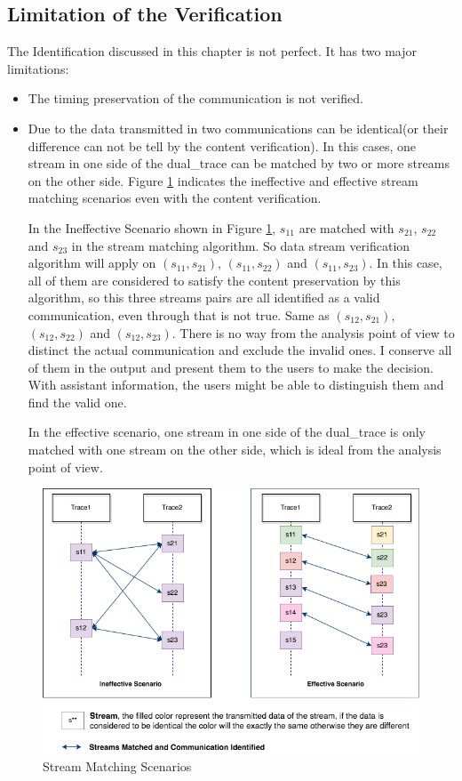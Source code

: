 \subsection{Limitation of the Verification}
The Identification discussed in this chapter is not perfect. It has two major limitations:
\begin{itemize}
    \item The timing preservation of the communication is not verified.
    \item Due to the data transmitted in two communications can be identical(or their difference can not be tell by the content verification). In this cases, one stream in one side of the dual\_trace can be matched by two or more streams on the other side. Figure \ref{secondlevelmatching} indicates the ineffective and effective stream matching scenarios even with the content verification. 
    
    In the Ineffective Scenario shown in Figure \ref{secondlevelmatching}, $s_{11}$ are matched with $s_{21}$, $s_{22}$ and $s_{23}$ in the stream matching algorithm. So data stream verification algorithm will apply on $(s_{11}, s_{21})$, $(s_{11}, s_{22})$ and $(s_{11}, s_{23})$. In this case, all of them are considered to satisfy the content preservation by this algorithm, so this three streams pairs are all identified as a valid communication, even through that is not true. Same as $(s_{12}, s_{21})$, $(s_{12}, s_{22})$ and $(s_{12}, s_{23})$. There is no way from the analysis point of view to distinct the actual communication and exclude the invalid ones. I conserve all of them in the output and present them to the users to make the decision. With assistant information, the users might be able to distinguish them and find the valid one.
    
In the effective scenario, one stream in one side of the dual\_trace is only matched with one stream on the other side, which is ideal from the analysis point of view.
\end{itemize}


\begin{figure}[H]
\centerline{\includegraphics[scale=0.7]{Figures/secondlevelmatching}}
 \caption{Stream Matching Scenarios}
\label{secondlevelmatching}
\end{figure}



